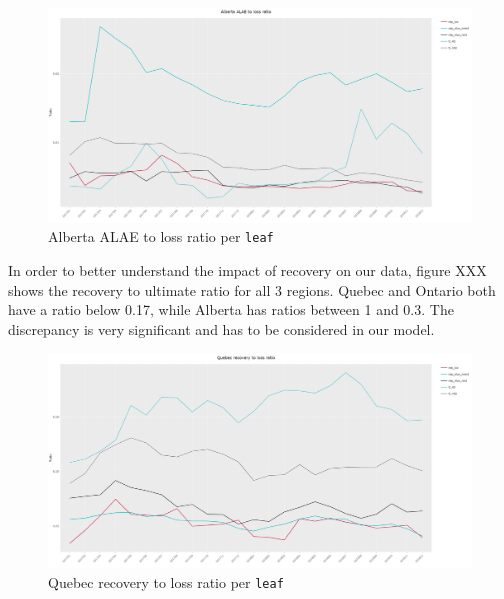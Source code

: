 	\begin{figure}[H]
		\begin{center}
				\includegraphics[scale=0.2]{Graphiques/AB_ALAE_loss} 
			\renewcommand{\figurename}{Figure}
			\caption{Alberta ALAE to loss ratio per \texttt{leaf}}\label{Fig_AB_ALAE_loss}
		\end{center}
	\end{figure}
	In order to better understand the impact of recovery on our data, figure XXX shows the recovery to ultimate ratio for all 3 regions. Quebec and Ontario both have a ratio below 0.17, while Alberta has ratios between 1 and 0.3. The discrepancy is very significant and has to be considered in our model.
		\begin{figure}[H]
		\begin{center}
			\includegraphics[scale=0.2]{Graphiques/QC_recovery_loss} 
			\renewcommand{\figurename}{Figure}
			\caption{Quebec recovery to loss ratio per \texttt{leaf}}\label{Fig_QC_recovery_loss}
		\end{center}
	\end{figure}
	
